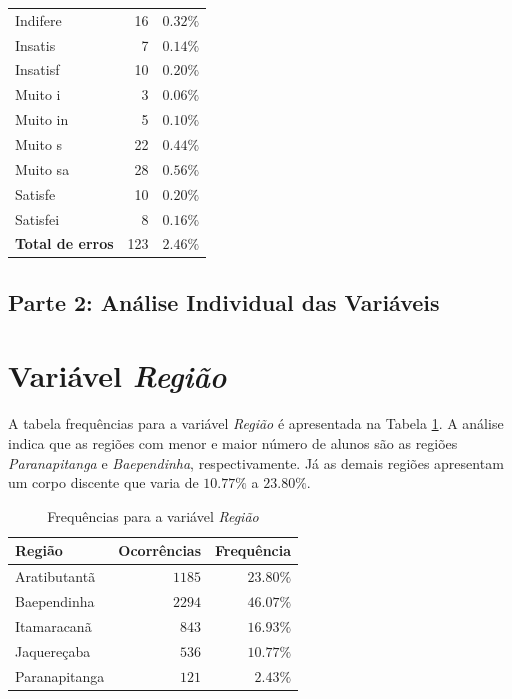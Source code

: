 \documentclass[10pt,a4paper,oneside]{article}
\newcommand{\arat}{Aratibutantã\xspace}
\newcommand{\baep}{Baependinha\xspace}
\newcommand{\itam}{Itamaracanã\xspace}
\newcommand{\jaqu}{Jaquereçaba\xspace}
\newcommand{\para}{Paranapitanga\xspace}
\begin{document}
\begin{table}[!h]
\begin{minipage}[t]{0.49\textwidth}
\begin{tabular}{l r r}
	Indifere   & 16  & $0.32\%$ \\
	Insatis    & 7   & $0.14\%$ \\
	Insatisf   & 10  & $0.20\%$ \\
	Muito i    & 3   & $0.06\%$ \\
	Muito in   & 5   & $0.10\%$ \\
	Muito s    & 22  & $0.44\%$ \\
	Muito sa   & 28  & $0.56\%$ \\
	Satisfe    & 10  & $0.20\%$ \\
	Satisfei   & 8   & $0.16\%$ \\	
	\midrule
	\textbf{Total de erros}  & 123  & $2.46\%$ \\	
	\bottomrule
\end{tabular}
\end{minipage}
\end{table}


\begin{table}[!h]
\centering

\end{table}

\FloatBarrier
\clearpage
\begin{center}
\section*{Parte 2: Análise Individual das Variáveis}
\end{center}

\section{Variável \textit{Região}}
\label{section:regiao}

A tabela frequências para a variável \textit{Região} é apresentada na Tabela \ref{table: frequencias regiao}. A análise indica que as regiões com menor e maior número de alunos são as regiões \textit{\para} e \textit{\baep}, respectivamente. Já as demais regiões apresentam um corpo discente que varia de $10.77\%$ a $23.80\%$.

\begin{table}[h]
\footnotesize
\centering
\caption{Frequências para a variável \textit{Região}}
\label{table: frequencias regiao}
\vspace{0.5em}
\begin{tabular}{l r r}
	\toprule
	\textbf{Região} & \textbf{Ocorrências} & \textbf{Frequência} \\
	\midrule
	\arat           & $1185$               & $23.80\%$           \\
	\baep           & $2294$               & $46.07\%$           \\
	\itam           & $843$                & $16.93\%$           \\
	\jaqu           & $536$                & $10.77\%$           \\
	\para           & $121$                & $2.43\%$            \\
	\bottomrule
\end{tabular}
\end{table}
\end{document}
